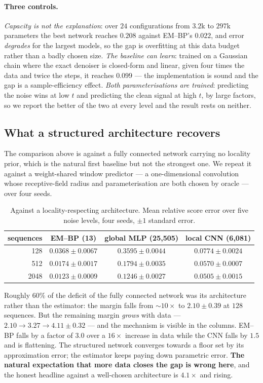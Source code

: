 \documentclass{article}
\begin{document}
\paragraph{Three controls.} \emph{Capacity is not the explanation}: over $24$ configurations
from $3.2$k to $297$k parameters the best network reaches $0.208$ against EM--BP's $0.022$,
and error \emph{degrades} for the largest models, so the gap is overfitting at this data
budget rather than a badly chosen size. \emph{The baseline can learn}: trained on a Gaussian
chain where the exact denoiser is closed-form and linear, given four times the data and twice
the steps, it reaches $0.099$ --- the implementation is sound and the gap is a
sample-efficiency effect. \emph{Both parameterisations are trained}: predicting the noise wins
at low $t$ and predicting the clean signal at high $t$, by large factors, so we report the
better of the two at every level and the result rests on neither.

\subsection{What a structured architecture recovers}

The comparison above is against a fully connected network carrying no locality prior, which
is the natural first baseline but not the strongest one. We repeat it against a
weight-shared window predictor --- a one-dimensional convolution whose receptive-field radius
and parameterisation are both chosen by oracle --- over four seeds.

\begin{table}[t]
\caption{Against a locality-respecting architecture. Mean relative score error over five
noise levels, four seeds, $\pm 1$ standard error.}
\label{tab:arch}
\centering
\begin{tabular}{rccc}
\toprule
sequences & EM--BP (13) & global MLP (25{,}505) & local CNN (6{,}081) \\
\midrule
128  & $\mathbf{0.0368 \pm 0.0067}$ & $0.3595 \pm 0.0044$ & $0.0774 \pm 0.0024$ \\
512  & $\mathbf{0.0174 \pm 0.0017}$ & $0.1794 \pm 0.0035$ & $0.0570 \pm 0.0007$ \\
2048 & $\mathbf{0.0123 \pm 0.0009}$ & $0.1246 \pm 0.0027$ & $0.0505 \pm 0.0015$ \\
\bottomrule
\end{tabular}
\end{table}

Roughly $60\%$ of the deficit of the fully connected network was its architecture rather than
the estimator: the margin falls from ${\sim}10\times$ to $2.10 \pm 0.39$ at $128$ sequences.
But the remaining margin \emph{grows} with data --- $2.10 \to 3.27 \to 4.11 \pm 0.32$ --- and
the mechanism is visible in the columns. EM--BP falls by a factor of $3.0$ over a $16\times$
increase in data while the CNN falls by $1.5$ and is flattening. The structured network
converges towards a floor set by its approximation error; the estimator keeps paying down
parametric error. \textbf{The natural expectation that more data closes the gap is wrong
here}, and the honest headline against a well-chosen architecture is $4.1\times$ and rising.
\end{document}
